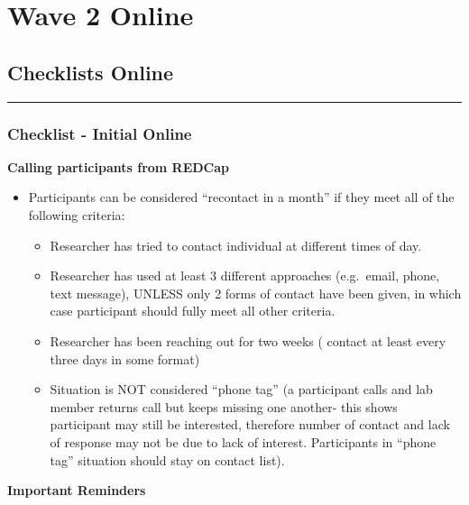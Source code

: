 \documentclass[]{book}
\providecommand{\tightlist}{%
  \setlength{\itemsep}{0pt}\setlength{\parskip}{0pt}}
\begin{document}
\hypertarget{wave-2-online-1}{%
\chapter{Wave 2 Online}\label{wave-2-online-1}}

\hypertarget{checklists-online-2}{%
\section{Checklists Online}\label{checklists-online-2}}

\begin{center}\rule{0.5\linewidth}{0.5pt}\end{center}

\hypertarget{checklist---initial-online-2}{%
\subsection{Checklist - Initial Online}\label{checklist---initial-online-2}}

\textbf{Calling participants from REDCap}

\begin{itemize}
\tightlist
\item
  Participants can be considered ``recontact in a month'' if they meet all of the following criteria:

  \begin{itemize}
  \tightlist
  \item
    Researcher has tried to contact individual at different times of day.
  \item
    Researcher has used at least 3 different approaches (e.g.~email, phone, text message), UNLESS only 2 forms of contact have been given, in which case participant should fully meet all other criteria.
  \item
    Researcher has been reaching out for two weeks ( contact at least every three days in some format)\\
  \item
    Situation is NOT considered ``phone tag'' (a participant calls and lab member returns call but keeps missing one another- this shows participant may still be interested, therefore number of contact and lack of response may not be due to lack of interest. Participants in ``phone tag'' situation should stay on contact list).
  \end{itemize}
\end{itemize}

\textbf{Important Reminders}
\end{document}
